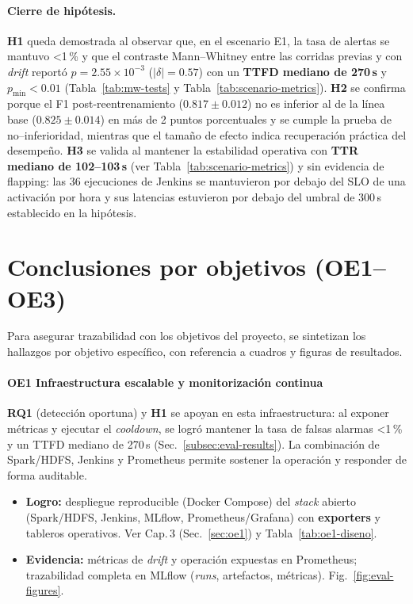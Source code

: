 \paragraph{Cierre de hipótesis.}
\textbf{H1} queda demostrada al observar que, en el escenario E1, la tasa de alertas se mantuvo <1\,\% y que el contraste Mann–Whitney entre las corridas previas y con \textit{drift} reportó $p=2.55\times10^{-3}$ ($|\delta|=0.57$) con un \textbf{TTFD mediano de 270\,s} y $p_{\min}<0.01$ (Tabla~\ref{tab:mw-tests} y Tabla~\ref{tab:scenario-metrics}). \textbf{H2} se confirma porque el F1 post-reentrenamiento ($0.817\pm0.012$) no es inferior al de la línea base ($0.825\pm0.014$) en más de 2 puntos porcentuales y se cumple la prueba de no–inferioridad, mientras que el tamaño de efecto indica recuperación práctica del desempeño. \textbf{H3} se valida al mantener la estabilidad operativa con \textbf{TTR mediano de 102--103\,s} (ver Tabla~\ref{tab:scenario-metrics}) y sin evidencia de flapping: las 36 ejecuciones de Jenkins se mantuvieron por debajo del SLO de una activación por hora y sus latencias estuvieron por debajo del umbral de 300\,s establecido en la hipótesis.

\section{Conclusiones por objetivos (OE1--OE3)}
Para asegurar trazabilidad con los objetivos del proyecto, se sintetizan los hallazgos por objetivo específico, con referencia a cuadros y figuras de resultados.

\paragraph{OE1 \;\textemdash\; Infraestructura escalable y monitorización continua}
\textbf{RQ1} (detección oportuna) y \textbf{H1} se apoyan en esta infraestructura: al exponer métricas y ejecutar el \textit{cooldown}, se logró mantener la tasa de falsas alarmas <1\,\% y un TTFD mediano de 270\,s (Sec.~\ref{subsec:eval-results}). La combinación de Spark/HDFS, Jenkins y Prometheus permite sostener la operación y responder de forma auditable.
\begin{itemize}\setlength\itemsep{2pt}
  \item \textbf{Logro:} despliegue reproducible (Docker Compose) del \textit{stack} abierto (Spark/HDFS, Jenkins, MLflow, Prometheus/Grafana) con \textbf{exporters} y tableros operativos. Ver Cap.\,3 (Sec.~\ref{sec:oe1}) y Tabla~\ref{tab:oe1-diseno}.
  \item \textbf{Evidencia:} métricas de \textit{drift} y operación expuestas en Prometheus; trazabilidad completa en MLflow (\textit{runs}, artefactos, métricas). Fig.~\ref{fig:eval-figures}.
\end{itemize}

